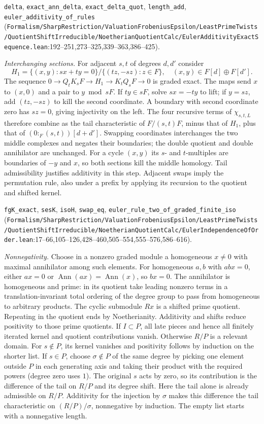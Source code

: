 {\footnotesize \nolinkurl{delta}, \nolinkurl{exact_ann_delta}, \nolinkurl{exact_delta_quot}, \nolinkurl{length_add}, \nolinkurl{euler_additivity_of_rules} (\nolinkurl{Formalism/SharpRestriction/ValuationFrobeniusEpsilon/LeastPrimeTwists/QuotientShiftIrreducible/NoetherianQuotientCalc/EulerAdditivityExactSequence.lean}\allowbreak:192--251,273--325,339--363,386--425).}

\emph{Interchanging sections.} For adjacent $s,t$ of degrees $d,d'$ consider
\[
 H_1=\{(x,y):sx+ty=0\}/\{(tz,-sz):z\in F\},\quad
 (x,y)\in F[d]\oplus F[d'] .
\]
The sequence $0\to Q_tK_sF\to H_1\to K_tQ_sF\to0$ is graded exact. The maps send $x$ to $(x,0)$ and a pair to $y\bmod sF$. If $ty\in sF$, solve $sx=-ty$ to lift; if $y=sz$, add $(tz,-sz)$ to kill the second coordinate. A boundary with second coordinate zero has $sz=0$, giving injectivity on the left. The four recursive terms of $\chi_{s,t,L}$ therefore combine as the tail characteristic of $F/(s,t)F$, minus that of $H_1$, plus that of $(0:_F(s,t))[d+d']$. Swapping coordinates interchanges the two middle complexes and negates their boundaries; the double quotient and double annihilator are unchanged. For a cycle $(x,y)$ its $s$- and $t$-multiples are boundaries of $-y$ and $x$, so both sections kill the middle homology. Tail admissibility justifies additivity in this step. Adjacent swaps imply the permutation rule, also under a prefix by applying its recursion to the quotient and shifted kernel.

{\footnotesize \nolinkurl{fgK_exact}, \nolinkurl{sesK}, \nolinkurl{isoH}, \nolinkurl{swap_eq}, \nolinkurl{euler_rule_two_of_graded_finite_iso} (\nolinkurl{Formalism/SharpRestriction/ValuationFrobeniusEpsilon/LeastPrimeTwists/QuotientShiftIrreducible/NoetherianQuotientCalc/EulerIndependenceOfOrder.lean}\allowbreak:17--66,105--126,428--460,505--554,555--576,586--616).}

\emph{Nonnegativity.} Choose in a nonzero graded module a homogeneous $x\ne0$ with maximal annihilator among such elements. For homogeneous $a,b$ with $abx=0$, either $ax=0$ or $\operatorname{Ann}(ax)=\operatorname{Ann}(x)$, so $bx=0$. The annihilator is homogeneous and prime: in its quotient take leading nonzero terms in a translation-invariant total ordering of the degree group to pass from homogeneous to arbitrary products. The cyclic submodule $Rx$ is a shifted prime quotient. Repeating in the quotient ends by Noetherianity. Additivity and shifts reduce positivity to those prime quotients. If $I\subset P$, all late pieces and hence all finitely iterated kernel and quotient contributions vanish. Otherwise $R/P$ is a relevant domain. For $s\notin P$, its kernel vanishes and positivity follows by induction on the shorter list. If $s\in P$, choose $\sigma\notin P$ of the same degree by picking one element outside $P$ in each generating axis and taking their product with the required powers (degree zero uses $1$). The original $s$ acts by zero, so its contribution is the difference of the tail on $R/P$ and its degree shift. Here the tail alone is already admissible on $R/P$. Additivity for the injection by $\sigma$ makes this difference the tail characteristic on $(R/P)/\sigma$, nonnegative by induction. The empty list starts with a nonnegative length.

